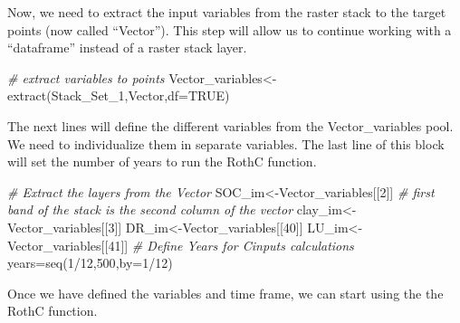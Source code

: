 \documentclass[
  10pt,
  b5paper,
]{book}
\newenvironment{Shaded}{\begin{snugshade}}{\end{snugshade}}
\newcommand{\AttributeTok}[1]{\textcolor[rgb]{0.77,0.63,0.00}{#1}}
\newcommand{\CommentTok}[1]{\textcolor[rgb]{0.56,0.35,0.01}{\textit{#1}}}
\newcommand{\ConstantTok}[1]{\textcolor[rgb]{0.00,0.00,0.00}{#1}}
\newcommand{\DecValTok}[1]{\textcolor[rgb]{0.00,0.00,0.81}{#1}}
\newcommand{\FunctionTok}[1]{\textcolor[rgb]{0.00,0.00,0.00}{#1}}
\newcommand{\NormalTok}[1]{#1}
\newcommand{\OtherTok}[1]{\textcolor[rgb]{0.56,0.35,0.01}{#1}}
\newcommand{\SpecialCharTok}[1]{\textcolor[rgb]{0.00,0.00,0.00}{#1}}
\begin{document}
Now, we need to extract the input variables from the raster stack to the target points (now called ``Vector''). This step will allow us to continue working with a ``dataframe'' instead of a raster stack layer.

\begin{Shaded}
\begin{Highlighting}[]
\CommentTok{\# extract variables to points}
\NormalTok{Vector\_variables}\OtherTok{\textless{}{-}}\FunctionTok{extract}\NormalTok{(Stack\_Set\_1,Vector,}\AttributeTok{df=}\ConstantTok{TRUE}\NormalTok{)}
\end{Highlighting}
\end{Shaded}

The next lines will define the different variables from the Vector\_variables pool. We need to individualize them in separate variables. The last line of this block will set the number of years to run the RothC function.

\begin{Shaded}
\begin{Highlighting}[]
\CommentTok{\# Extract the layers from the Vector}
\NormalTok{SOC\_im}\OtherTok{\textless{}{-}}\NormalTok{Vector\_variables[[}\DecValTok{2}\NormalTok{]] }\CommentTok{\# first band of the stack is the second column of the vector}
\NormalTok{clay\_im}\OtherTok{\textless{}{-}}\NormalTok{Vector\_variables[[}\DecValTok{3}\NormalTok{]]}
\NormalTok{DR\_im}\OtherTok{\textless{}{-}}\NormalTok{Vector\_variables[[}\DecValTok{40}\NormalTok{]]}
\NormalTok{LU\_im}\OtherTok{\textless{}{-}}\NormalTok{Vector\_variables[[}\DecValTok{41}\NormalTok{]]}
\CommentTok{\# Define Years for Cinputs calculations}
\NormalTok{years}\OtherTok{=}\FunctionTok{seq}\NormalTok{(}\DecValTok{1}\SpecialCharTok{/}\DecValTok{12}\NormalTok{,}\DecValTok{500}\NormalTok{,}\AttributeTok{by=}\DecValTok{1}\SpecialCharTok{/}\DecValTok{12}\NormalTok{)}
\end{Highlighting}
\end{Shaded}

Once we have defined the variables and time frame, we can start using the the RothC function.
\end{document}
